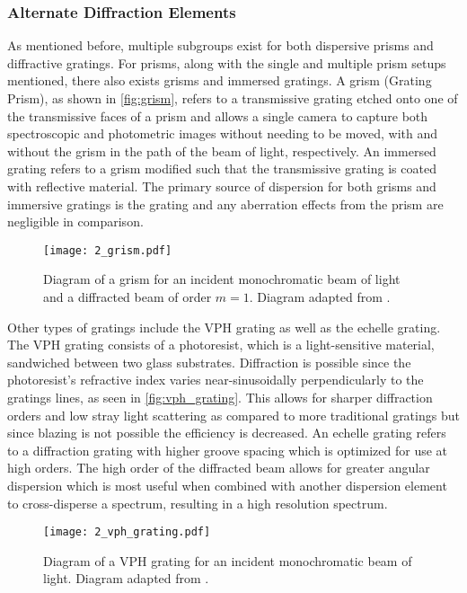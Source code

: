\subsubsection{Alternate Diffraction Elements}

As mentioned before, multiple subgroups exist for both dispersive prisms and diffractive gratings.
For prisms, along with the single and multiple prism setups mentioned, there also exists grisms and immersed gratings.
A grism (Grating Prism), as shown in \autoref{fig:grism}, refers to a transmissive grating etched onto one of the transmissive faces of a prism and allows a single camera to capture both spectroscopic and photometric images without needing to be moved, with and without the grism in the path of the beam of light, respectively.
An immersed grating refers to a grism modified such that the transmissive grating is coated with reflective material.
The primary source of dispersion for both grisms and immersive gratings is the grating and any aberration effects from the prism are negligible in comparison.

\begin{figure}[t]
    \centering
    \texttt{[image: 2\_grism.pdf]}
    \caption{
        Diagram of a grism for an incident monochromatic beam of light and a diffracted beam of order $m = 1$.
        Diagram adapted from \cite{BirneyObsAstro}.
    }
    \label{fig:grism}
\end{figure}

Other types of gratings include the \gls{VPH} grating as well as the echelle grating.
The \gls{VPH} grating consists of a photoresist, which is a light-sensitive material, sandwiched between two glass substrates.
Diffraction is possible since the photoresist's refractive index varies near-sinusoidally perpendicularly to the gratings lines, as seen in \autoref{fig:vph_grating}.
This allows for sharper diffraction orders and low stray light scattering as compared to more traditional gratings but since blazing is not possible the efficiency is decreased.
An echelle grating refers to a diffraction grating with higher groove spacing which is optimized for use at high orders.
The high order of the diffracted beam allows for greater angular dispersion which is most useful when combined with another dispersion element to cross-disperse a spectrum, resulting in a high resolution spectrum.

\begin{figure}[t]
    \centering
    \texttt{[image: 2\_vph\_grating.pdf]}
    \caption{
        Diagram of a \gls{VPH} grating for an incident monochromatic beam of light.
        Diagram adapted from \cite{BirneyObsAstro}.
    }
    \label{fig:vph_grating}
\end{figure}

